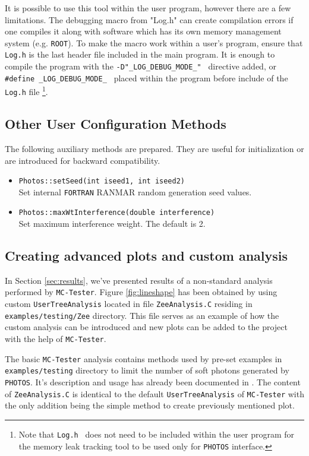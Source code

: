 \documentclass[]{Photos_interface_design}
\begin{document}
It is possible to use this tool within the user program, however there are a few limitations.
The debugging macro from "Log.h" can create compilation errors if one compiles
it along with software which has its own memory management system (e.g. {\tt ROOT}).
To make the macro work within a user's program, ensure that {\tt Log.h} is the last header file
included in the main program.
It is enough to  compile the program with the {\tt -D"\_LOG\_DEBUG\_MODE\_" } directive added,
or {\tt \#define \_LOG\_DEBUG\_MODE\_ } placed within the program before include
of the {\tt Log.h} file%
\footnote{Note that {\tt Log.h } does not need to be included within
the user program  for the memory leak tracking tool to be used only for {\tt PHOTOS} interface.
}.

\subsection{Other User Configuration Methods}
\label{subsection:other_methods}

The following auxiliary methods are prepared. They are useful for initialization 
or are introduced for backward compatibility.

\begin{itemize}
  \item {\tt Photos::setSeed(int iseed1, int iseed2)} \\
        Set internal {\tt FORTRAN} RANMAR random generation seed values.
   \item {\tt Photos::maxWtInterference(double interference)} \\
        Set maximum interference weight. The default is 2.
\end{itemize}

\subsection{Creating advanced plots and custom analysis}
\label{App:Plots}

In Section \ref{sec:results}, we've presented results of a non-standard
analysis performed by {\tt MC-Tester}. Figure \ref{fig:lineshape} has been
obtained by using custom {\tt UserTreeAnalysis} located in file {\tt ZeeAnalysis.C}
residing in {\tt examples/testing/Zee} directory. This file serves as an
example of how the custom analysis can be introduced and new plots can be
added to the project with the help of {\tt MC-Tester}.

The basic {\tt MC-Tester} analysis contains methods used by pre-set examples
in {\tt examples/testing} directory to limit the number of soft photons generated
by {\tt PHOTOS}. It's description and usage has already been documented in \cite{??}.
The content of {\tt ZeeAnalysis.C} is identical to the default {\tt UserTreeAnalysis}
of {\tt MC-Tester} with the only addition being the simple method to create
previously mentioned plot.
\end{document}
